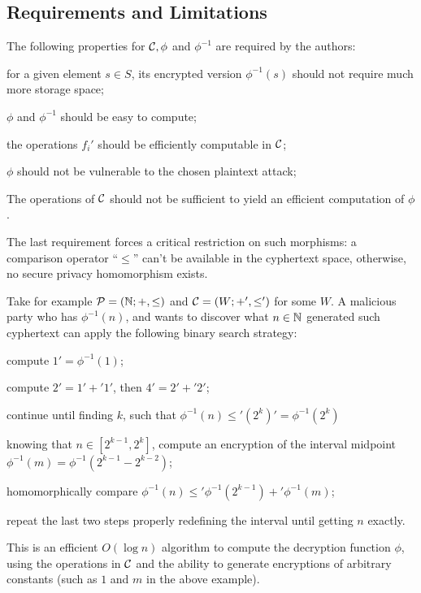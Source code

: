 \subsection{Requirements and Limitations}
The following properties for $\mathcal C,\phi$ and $\phi^{-1}$ are required by the authors:
\begin{alineas}
    \item for a given element $s\in S$, its encrypted version $\phi^{-1}(s)$ should not require much more storage space;
    \item $\phi$ and $\phi^{-1}$ should be easy to compute;
    \item the operations $f_i'$ should be efficiently computable in $\mathcal C$;
    \item $\phi$ should not be vulnerable to the chosen plaintext attack;
    \item The operations of $\mathcal C$ should not be sufficient to yield an efficient computation of $\phi$.
\end{alineas}

The last requirement forces a critical restriction on such morphisms: a comparison operator ``$\leq$'' can't be available in the cyphertext space, otherwise, no secure privacy homomorphism exists.

Take for example $\mathcal P = (\mathbb{N};+,\leq)$ and $\mathcal C = (W;+',\leq')$ for some $W$. A malicious party who has $\phi^{-1}(n)$, and wants to discover what $n\in\mathbb{N}$ generated such cyphertext can apply the following binary search strategy:
\begin{alineas}
\item compute $1'=\phi^{-1}(1)$;
\item compute $2'=1'+'1'$, then $4'=2'+'2'$;
\item continue until finding $k$, such that $\phi^{-1}(n)\leq'(2^k)'=\phi^{-1}(2^k)$
\item knowing that $n\in[2^{k-1},2^{k}]$, compute an encryption of the interval midpoint $\phi^{-1}(m)=\phi^{-1}(2^{k-1}-2^{k-2})$;
\item homomorphically compare $\phi^{-1}(n)\leq'\phi^{-1}(2^{k-1})+'\phi^{-1}(m)$;
\item repeat the last two steps properly redefining the interval until getting $n$ exactly.
\end{alineas}
This is an efficient $O(\log n)$ algorithm to compute the decryption function $\phi$, using the operations in $\mathcal C$ and the ability to generate encryptions of arbitrary constants (such as $1$ and $m$ in the above example).

